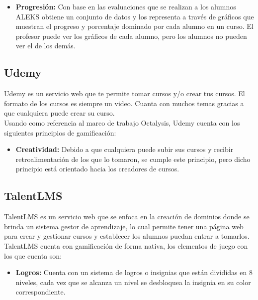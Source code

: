 \begin{multicols*}{2}
\begin{itemize}
        \item {\bf Progresión:} Con base en las evaluaciones que se realizan a los
            alumnos ALEKS obtiene un conjunto de datos y los representa a través
            de gráficos que muestran el progreso y porcentaje dominado por cada
            alumno en un curso. El profesor puede ver los gráficos de cada alumno,
            pero los alumnos no pueden ver el de los demás.
    \end{itemize}


\vfill\null
\columnbreak
\subsection*{Udemy}

 Udemy \cite{PagUdemy} es un servicio web que te permite tomar cursos y/o crear tus
 cursos. El formato de los cursos es siempre un video. Cuanta con muchos temas gracias
 a que cualquiera puede crear su curso.\\

    \noindent Usando como referencia al marco de trabajo Octalysis,
    Udemy cuenta con los siguientes principios de gamificación:

    \begin{itemize}
        \item {\bf Creatividad:} Debido a que cualquiera puede subir
        sus cursos y recibir retroalimentación de los que lo tomaron,
        se cumple este principio, pero dicho principio está orientado
        hacia los creadores de cursos.
    \end{itemize}

\subsection*{TalentLMS}

 TalentLMS \cite{PagTalentLMS} es un servicio web que se enfoca en la creación de dominios
 donde se brinda un sistema gestor de aprendizaje, lo cual permite tener una página web para
 crear y gestionar cursos y establecer los alumnos puedan entrar a tomarlos.\\

    \noindent TalentLMS cuenta con gamificación de forma nativa,
    los elementos de juego con los que cuenta son:

    \begin{itemize}

        \item {\bf Logros:} Cuenta con un sistema de logros o insignias que
            están divididas en 8 niveles, cada vez que se alcanza un nivel se
            desbloquea la insignia en su color correspondiente.


\end{itemize}
\end{multicols*}
